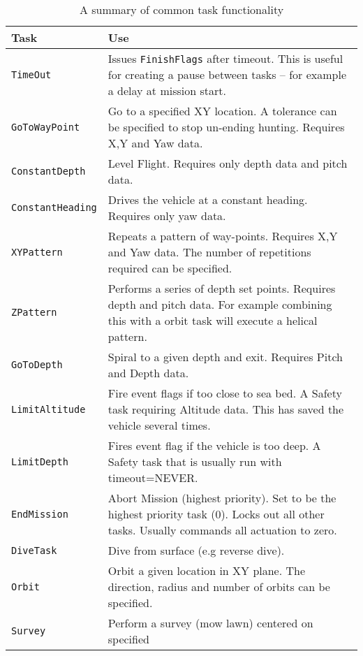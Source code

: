 \documentclass[a4paper,10pt]{article}
\newcommand{\Code}[1]{\texttt{#1} }
\newcommand{\code}[1]{\Code{#1} }
\begin{document}
\begin{table}[ht]
\caption{A summary of common task functionality} \centering
%
\begin{tabular}{p{}|p{}}

{\textbf{Task}}  &  {\textbf{Use}} \\ \hline
%
\code{TimeOut} & Issues \code{FinishFlags} after timeout. This is
useful for creating a pause between tasks -- for example a delay at
mission start.
\\%
%
\code{GoToWayPoint} & Go to a specified XY location. A tolerance
can be specified to stop un-ending hunting. Requires X,Y and Yaw
data.
\\%
%
\code{ConstantDepth}  & Level Flight. Requires only depth data and
pitch data.
\\%
%
\code{ConstantHeading} & Drives the vehicle at a constant heading.
Requires only yaw data.
\\%
%
\code{XYPattern} & Repeats a pattern of way-points. Requires X,Y
and Yaw data. The number of repetitions required can be specified.
\\%
%
\code{ZPattern} & Performs a series of depth set points. Requires
depth and pitch data. For example combining this with a orbit task
will execute a helical pattern.
\\%
%
\code{GoToDepth} & Spiral to a given depth and exit. Requires
Pitch and Depth data.
\\%
%
\code{LimitAltitude} & Fire event flags if too close to sea bed. A
Safety task requiring Altitude data. This has saved the vehicle
several times.
\\%
%
\code{LimitDepth} & Fires event flag if the vehicle is too deep. A
Safety task that is usually run with timeout=NEVER.
\\%
%
\code{EndMission} & Abort Mission (highest priority). Set to be
the highest priority task (0). Locks out all other tasks. Usually
commands all actuation to zero.
\\%
%
\code{DiveTask}  & Dive from surface (e.g reverse dive). \\%
%
\code{Orbit} & Orbit a given location in XY plane. The direction, radius and number of orbits can be specified. \\%
%
\code{Survey} & Perform a survey (mow lawn) centered  on specified

\end{tabular}
\end{table}
\end{document}
